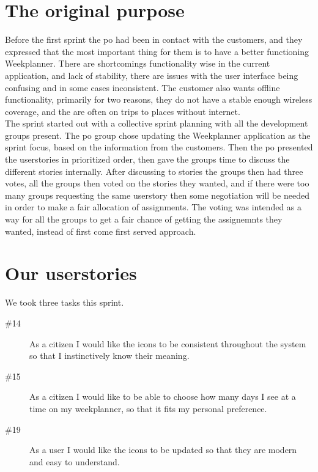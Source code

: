 \section{The original purpose}
Before the first sprint the \gls{po} had been in contact with the customers, and they expressed that the most important thing for them is to have a better functioning Weekplanner.
There are shortcomings functionality wise  in the current application, and lack of stability, there are issues with the user interface being confusing and in some cases inconsistent. The customer also wants offline functionality, primarily for two reasons, they do not have a stable enough wireless coverage, and the are often on trips to places without internet.
\\
The sprint started out with a collective sprint planning with all the development groups  present. The \gls{po} group chose updating the Weekplanner application as the sprint focus, based on the information from the customers. Then the \gls{po} presented the userstories in prioritized order, then gave the groups time to discuss the different stories internally. After discussing to stories the groups then had three votes, all the groups then voted on the stories they wanted, and if there were too many groups requesting the same userstory then some negotiation will be needed in order to make a fair allocation of assignments. The voting was intended as a way for all the groups to get a fair chance of getting the assignemnts they wanted, instead of first come first served approach.\newline

\section{Our userstories}
We took three tasks this sprint.
\begin{description}
    \item [\#14] As a citizen I would like the icons to be consistent throughout the system so that I instinctively know their meaning.
    \item [\#15] As a citizen I would like to be able to choose how many days I see at a time on my weekplanner, so that it fits my personal preference.
    \item [\#19] As a user I would like the icons to be updated so that they are modern and easy to understand.
\end{description}

